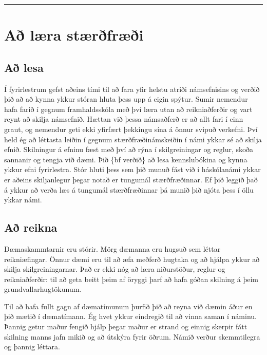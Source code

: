 \documentclass[a4paper,10pt,icelandic]{sphinxmanual}
\begin{document}
\newpage


\bigskip\hrule\bigskip



\section{Að læra stærðfræði}
\label{\detokenize{vidauki:a-laera-staerfraei}}


\subsection{Að lesa}
\label{\detokenize{vidauki:a-lesa}}
Í fyrirlestrum gefst aðeins
tími til að fara yfir helstu atriði námsefnisins og verðið þið að
að kynna ykkur stóran hluta þess upp á eigin spýtur. Sumir nemendur
hafa farið í gegnum framhaldsskóla með því
læra utan að reikniaðferðir og vart reynt að skilja námsefnið.  Hættan
við þessa námsaðferð er að allt fari
í einn graut, og
nemendur geti ekki yfirfært þekkingu sína á önnur svipuð verkefni.
Því held ég að léttasta leiðin í gegnum stærðfræðinámskeiðin í námi
ykkar sé að skilja efnið.  Skilningur á efninu fæst með því að rýna í
skilgreiningar og reglur, skoða sannanir og tengja við dæmi.
Þið \{bf verðið\} að lesa
kennslubókina og kynna ykkur efni fyrirlestra.
Stór hluti þess sem þið munuð fást við í
háskólanámi ykkar er aðeins skiljanlegur þegar notað er tungumál
stærðfræðinnar.  Ef þið leggið það á ykkur að verða læs á tungumál
stærðfræðinnar þá munið þið njóta þess í öllu ykkar námi.


\subsection{Að reikna}
\label{\detokenize{vidauki:a-reikna}}
Dæmaskammtarnir eru stórir.  Mörg dæmanna eru hugsuð
sem léttar reikniæfingar.
Önnur dæmi eru til að æfa
meðferð hugtaka og að hjálpa ykkur að skilja
skilgreiningarnar.  Það er ekki nóg að læra niðurstöður, reglur og
reikniaðferðir: til að geta beitt þeim af öryggi þarf að hafa góðan
skilning á þeim grundvallarhugtökunum.

Til að hafa fullt gagn af dæmatímunum þurfið þið að reyna við dæmin
áður en þið mætið í dæmatímann.
Ég hvet ykkur eindregið til að vinna saman í náminu.  Þannig getur
maður fengið hjálp þegar maður er strand og
einnig skerpir fátt skilning manns  jafn mikið og að útskýra
fyrir öðrum.  Námið verður  skemmtilegra og þannig
léttara.
\end{document}
